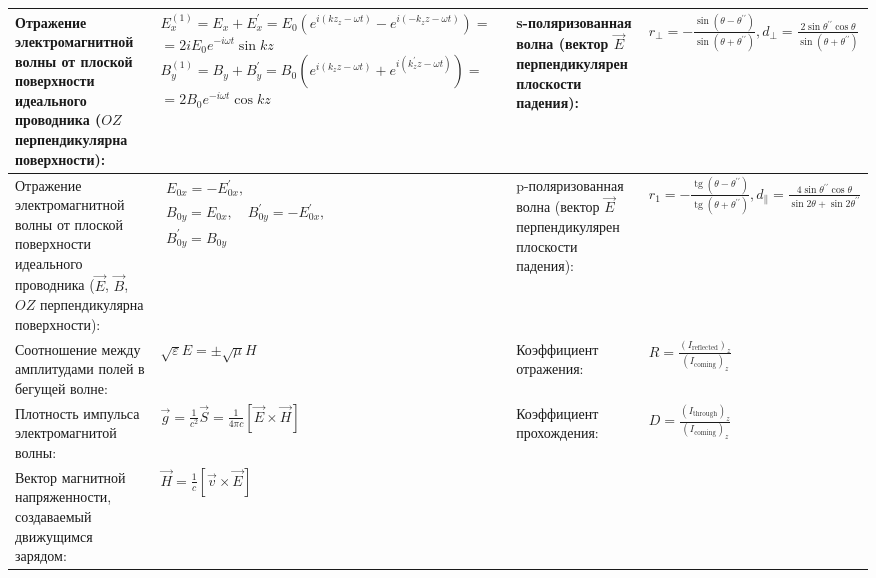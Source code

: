 \documentclass{article}
\begin{document}
\begin{tabular}{ |p{5cm}|p{4.5cm}|p{6cm}|p{3.5cm}|  }
Отражение электромагнитной волны от плоской поверхности идеального проводника ($OZ$ перпендикулярна поверхности): &
$E_{x}^{(1)}=E_{x}+E_{x}^{\prime}=E_{0}\left(e^{i\left(k z_{z}-\omega t\right)}-e^{i\left(-k_{z} z-\omega t\right)}\right)=$
$=2 i E_{0} e^{-i \omega t} \sin k z$
$B_{y}^{(1)}=B_{y}+B_{y}^{\prime}=B_{0}\left(e^{i\left(k_{z} z-\omega t\right)}+e^{i\left(k_{z}^{\prime} z-\omega t\right)}\right)=$
$=2 B_{0} e^{-i \omega t} \cos k z$                                        &
s-поляризованная волна (вектор $\vec{E}$ перпендикулярен плоскости падения):&
$r_{\perp}=-\frac{\sin \left(\theta-\theta^{\prime \prime}\right)}{\sin \left(\theta+\theta^{\prime \prime}\right)}, d_{\perp}=\frac{2 \sin \theta^{\prime \prime} \cos \theta}{\sin \left(\theta+\theta^{\prime \prime}\right)}$\\
\hline
Отражение электромагнитной волны от плоской поверхности идеального проводника ($\vec{E}$, $\vec{B}$, $OZ$ перпендикулярна поверхности):&
$\begin{aligned}
E_{0 x}=-E_{0 x}^{\prime}, \\
B_{0 y}=E_{0 x}, \quad B_{0 y}^{\prime}=-E_{0 x}^{\prime}, \\
B_{0 y}^{\prime}=B_{0 y}
\end{aligned}$                                                             &
p-поляризованная волна (вектор $\vec{E}$ перпендикулярен плоскости падения):&
$r_{1}=-\frac{\operatorname{tg}\left(\theta-\theta^{\prime \prime}\right)}{\operatorname{tg}\left(\theta+\theta^{\prime \prime}\right)}, d_{\|}=\frac{4 \sin \theta^{\prime \prime} \cos \theta}{\sin 2 \theta+\sin 2 \theta^{\prime \prime}}$\\
\hline
Соотношение между амплитудами полей в бегущей волне:                       &
$\sqrt{\varepsilon} E=\pm \sqrt{\mu} H$                                    &
Коэффициент отражения:                                                     &
$R=\frac{\left(I_{\mathrm{reflected}}\right)_{z}}{\left(I_{\mathrm{coming}}\right)_{z}}$\\
\hline
Плотность импульса электромагнитой волны:                                  &
$\vec{g}=\frac{1}{c^{2}} \vec{S}=\frac{1}{4 \pi c} [\vec{E} \times \vec{H}]$&
Коэффициент прохождения:                                                   &
$D=\frac{\left(I_{\text {through}}\right)_{z}}{\left(I_{\text {coming}}\right)_{z}}$ \\
\hline
Вектор магнитной напряженности, создаваемый движущимся зарядом:            &
$\vec{H}=\frac{1}{c} [\vec{v} \times \vec{E}]$                             &

\end{tabular}
\end{document}
